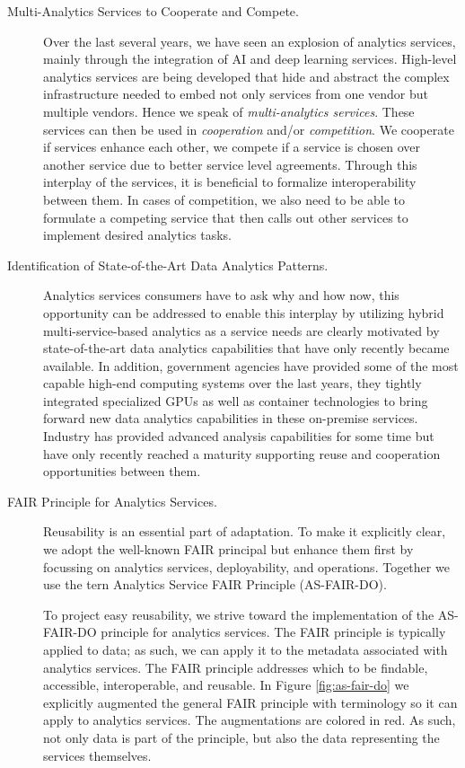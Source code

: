 \begin{description}
\item[Multi-Analytics Services to Cooperate and Compete.]

Over the last several years, we have seen an explosion of analytics
services, mainly through the integration of AI and deep learning
services. High-level analytics services are being developed that hide
and abstract the complex infrastructure needed to embed not only
services from one vendor but multiple vendors. Hence we speak of {\em
multi-analytics services}. These services can then be used in {\em
cooperation} and/or {\em competition}. We cooperate if services
enhance each other, we compete if a service is chosen over another
service due to better service level agreements. Through this interplay
of the services, it is beneficial to formalize interoperability
between them. In cases of competition, we also need to be able to
formulate a competing service that then calls out other services to
implement desired analytics tasks.

\item[Identification of State-of-the-Art Data Analytics Patterns.]

Analytics services consumers have to ask why and how now,
this opportunity can be addressed to enable this interplay by utilizing
hybrid multi-service-based analytics as a service needs are clearly
motivated by state-of-the-art data analytics capabilities that have
only recently became available. In addition, government agencies have
provided some of the most capable high-end computing systems over the
last years, they tightly integrated specialized GPUs as well as
container technologies to bring forward new data analytics
capabilities in these on-premise services. Industry has provided
advanced analysis capabilities for some time but have only recently
reached a maturity supporting reuse and cooperation opportunities
between them.


\item[FAIR Principle for Analytics Services.]
\label{sec:fair}

Reusability is an essential part of adaptation. To make it explicitly
clear, we adopt the well-known FAIR principal \cite{fair-principle} but enhance
them first by focussing on analytics services, deployability, and
operations. Together we use the tern Analytics Service FAIR Principle
(AS-FAIR-DO).

To project easy reusability, we strive toward the implementation of
the AS-FAIR-DO principle for analytics services. The FAIR principle is
typically applied to data; as such, we can apply it to the metadata
associated with analytics services. The FAIR principle addresses which
to be findable, accessible, interoperable, and reusable. In
Figure \ref{fig:as-fair-do} we explicitly augmented the general FAIR
principle with terminology so it can apply to analytics services. The
augmentations are colored in red. As such, not only data is part of the
principle, but also the data representing the services themselves.

\end{description}

